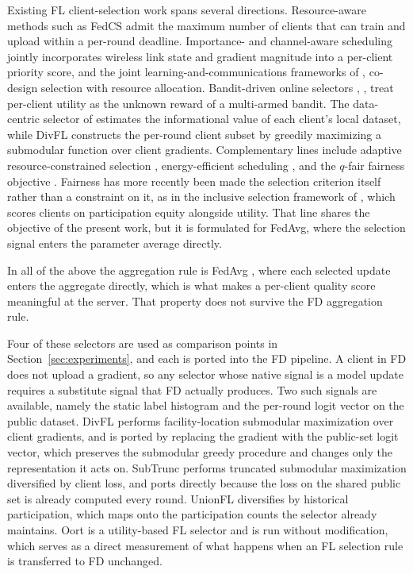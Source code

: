 \documentclass[journal]{IEEEtran}
\newcommand{\rev}[1]{{\color{blue}#1}}
\begin{document}
Existing FL client-selection work spans several directions. Resource-aware methods such as FedCS \cite{nishio2019client} admit the maximum number of clients that can train and upload within a per-round deadline. Importance- and channel-aware scheduling \cite{yang2020scheduling, ren2020scheduling, shi2020joint} jointly incorporates wireless link state and gradient magnitude into a per-client priority score, and the joint learning-and-communications frameworks of \cite{chen2021joint}, \cite{chen2021convergence} co-design selection with resource allocation. Bandit-driven online selectors \cite{xia2020mab}, \cite{cho2020bandit}, \cite{xu2021online} treat per-client utility as the unknown reward of a multi-armed bandit. The data-centric selector of \cite{saha2023datacentric} estimates the informational value of each client's local dataset, while DivFL \cite{balakrishnan2022divfl} constructs the per-round client subset by greedily maximizing a submodular function over client gradients. Complementary lines include adaptive resource-constrained selection \cite{wang2019adaptive}, energy-efficient scheduling \cite{yang2021energy}, and the $q$-fair fairness objective \cite{li2020qffl}. \rev{Fairness has more recently been made the selection criterion itself rather than a constraint on it, as in the inclusive selection framework of \cite{arisdakessian2026vox}, which scores clients on participation equity alongside utility. That line shares the objective of the present work, but it is formulated for FedAvg, where the selection signal enters the parameter average directly.}

In all of the above the aggregation rule is FedAvg \cite{mcmahan2017communication}, where each selected update enters the aggregate directly, which is what makes a per-client quality score meaningful at the server. That property does not survive the FD aggregation rule.

\rev{Four of these selectors are used as comparison points in Section~\ref{sec:experiments}, and each is ported into the FD pipeline. A client in FD does not upload a gradient, so any selector whose native signal is a model update requires a substitute signal that FD actually produces. Two such signals are available, namely the static label histogram and the per-round logit vector on the public dataset. DivFL \cite{balakrishnan2022divfl} performs facility-location submodular maximization over client gradients, and is ported by replacing the gradient with the public-set logit vector, which preserves the submodular greedy procedure and changes only the representation it acts on. SubTrunc \cite{castillo2024subtrunc} performs truncated submodular maximization diversified by client loss, and ports directly because the loss on the shared public set is already computed every round. UnionFL \cite{castillo2024unionfl} diversifies by historical participation, which maps onto the participation counts the selector already maintains. Oort \cite{lai2021oort} is a utility-based FL selector and is run without modification, which serves as a direct measurement of what happens when an FL selection rule is transferred to FD unchanged.}
\end{document}
